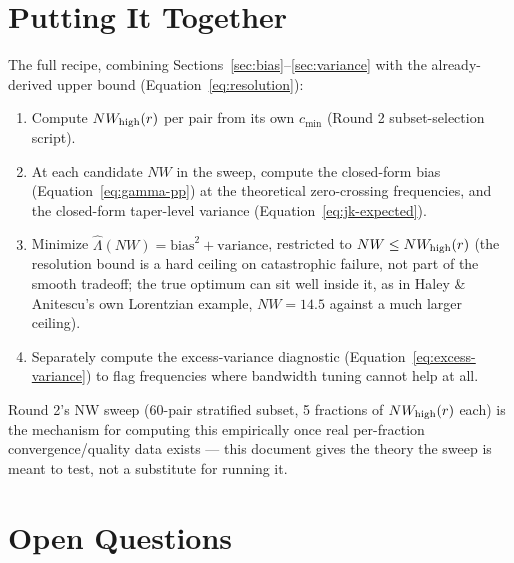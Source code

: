 \documentclass[11pt]{article}
\begin{document}
\section{Putting It Together}
\label{sec:mse-recipe}

The full recipe, combining Sections~\ref{sec:bias}--\ref{sec:variance} with the already-derived
upper bound (Equation~\ref{eq:resolution}):
\begin{enumerate}[nosep]
  \item Compute $NW_{\rm high}(r)$ per pair from its own $c_{\min}$ (Round 2 subset-selection
    script).
  \item At each candidate $NW$ in the sweep, compute the closed-form bias
    (Equation~\ref{eq:gamma-pp}) at the theoretical zero-crossing frequencies, and the closed-form
    taper-level variance (Equation~\ref{eq:jk-expected}).
  \item Minimize $\hat\Lambda(NW) = \mathrm{bias}^2 + \mathrm{variance}$, restricted to $NW \le
    NW_{\rm high}(r)$ (the resolution bound is a hard ceiling on catastrophic failure, not part
    of the smooth tradeoff; the true optimum can sit well inside it, as in Haley \&
    Anitescu's own Lorentzian example, $NW=14.5$ against a much larger ceiling).
  \item Separately compute the excess-variance diagnostic (Equation~\ref{eq:excess-variance}) to
    flag frequencies where bandwidth tuning cannot help at all.
\end{enumerate}
Round 2's NW sweep (60-pair stratified subset, 5 fractions of $NW_{\rm high}(r)$ each) is the
mechanism for computing this empirically once real per-fraction convergence/quality data exists
--- this document gives the theory the sweep is meant to test, not a substitute for running it.

\section{Open Questions}
\end{document}
